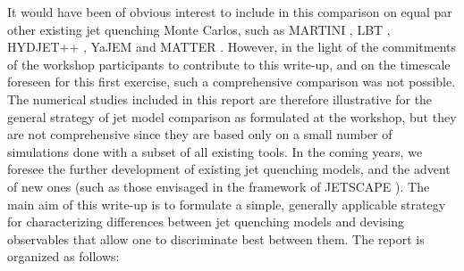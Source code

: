It would have been of obvious interest to include in this comparison on equal par other existing jet quenching Monte Carlos, such as MARTINI \cite{Schenke:2009gb,Young:2011ug}, LBT \cite{Wang:2013cia,He:2015pra}, HYDJET++ \cite{Lokhtin:2008xi}, YaJEM \cite{Renk:2010zx} and MATTER \cite{Majumder:2013re}. However, in the light of the commitments of the workshop participants 
to contribute to this write-up, and on the timescale foreseen for this first exercise, such a comprehensive comparison was not possible. 
The numerical studies included in this report are therefore illustrative for the general strategy of jet model comparison as formulated at the workshop, 
but they are not comprehensive since they are based only on a small number of simulations done with a subset of all existing tools. In the coming years,
we  foresee the further development of existing jet quenching models, and the advent of new ones (such as those envisaged in the framework of 
JETSCAPE \cite{Cao:2017zih}). The main aim of this write-up is to formulate a simple, generally applicable strategy for characterizing differences
between jet quenching models and devising observables that allow one to discriminate best between them. The report is organized as follows:

